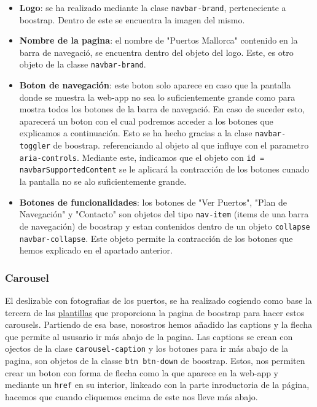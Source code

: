 \documentclass{article}
\begin{document}
\begin{itemize}
    \item \textbf{Logo}: se ha realizado mediante la clase \texttt{navbar-brand}, perteneciente a boostrap. Dentro de este se encuentra la imagen del mismo.
    \item \textbf{Nombre de la pagina}: el nombre de "Puertos Mallorca" contenido en la barra de navegació, se encuentra dentro del objeto del logo. Este, es otro objeto de la classe \texttt{navbar-brand}.
    \item \textbf{Boton de navegación}: este boton solo aparece en caso que la pantalla donde se muestra la web-app no sea lo suficientemente grande como para mostra todos los botones de la barra de navegació. En caso de suceder esto, aparecerá un boton con el cual podremos acceder a los botones que explicamos a continuación. Esto se ha hecho gracias a la clase \texttt{navbar-toggler} de boostrap. referenciando al objeto al que influye con el parametro \texttt{aria-controls}. Mediante este, indicamos que el objeto con \texttt{id = navbarSupportedContent} se le aplicará la contracción de los botones cunado la pantalla no se alo suficientemente grande.
    \item \textbf{Botones de funcionalidades}: los botones de "Ver Puertos", "Plan de Navegación" y "Contacto" son objetos del tipo \texttt{nav-item} (items de una barra de navegación) de boostrap y estan contenidos dentro de un objeto \texttt{collapse navbar-collapse}. Este objeto permite la contracción de los botones que hemos explicado en el apartado anterior.
\end{itemize}

\subsubsection{Carousel}
El deslizable con fotografias de los puertos, se ha realizado cogiendo como base la tercera de las \href{https://getbootstrap.com/docs/5.3/components/carousel/}{plantillas} que proporciona la pagina de boostrap para hacer estos carousels. Partiendo de esa base, nosostros hemos añadido las captions y la flecha que permite al ususario ir más abajo de la pagina. Las captions se crean con ojectos de la clase \texttt{carousel-caption} y los botones para ir más abajo de la pagina, son objetos de la classe \texttt{btn btn-down} de boostrap. Estos, nos permiten crear un boton con forma de flecha como la que aparece en la web-app y mediante un \texttt{href} en su interior, linkeado con la parte inroductoria de la página, hacemos que cuando cliquemos encima de este nos lleve más abajo.
\end{document}
